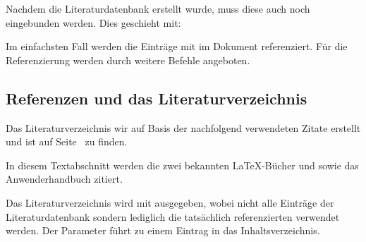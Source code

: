 \documentclass[%
  english,ngerman,%
  geometry=no,DIV=12,automark,%
]{tudscrartcl}
\begin{document}
%
Nachdem die Literaturdatenbank erstellt wurde, muss diese auch noch eingebunden 
werden. Dies geschieht mit:
%
\begin{Preamble}


\end{Preamble}
%
Im einfachsten Fall werden die Einträge mit  im 
Dokument referenziert. Für die Referenzierung werden durch  
weitere Befehle angeboten.
%
\begin{refsection}
\begin{Trunk+}
\section{Referenzen und das Literaturverzeichnis}
Das Literaturverzeichnis wir auf Basis der nachfolgend verwendeten 
Zitate erstellt und ist auf Seite~\pageref{sec:bibliography} zu finden.
\end{Trunk+}
\begin{Trunk*}
In diesem Textabschnitt werden die zwei bekannten \LaTeX-Bücher
\cite{knuth84} und \cite{goossens94} sowie das Anwenderhandbuch
\cite{hanisch14} zitiert.

\end{Trunk*}
%
Das Literaturverzeichnis wird mit  ausgegeben, wobei 
nicht alle Einträge der Literaturdatenbank sondern lediglich die tatsächlich 
referenzierten verwendet werden. Der Parameter  führt 
zu einem Eintrag in das Inhaltsverzeichnis.
%
\begin{Hint}
\printbibliography[heading=bibintoc]
\end{Hint}
\begin{quoting}[rightmargin=0pt]
\makeatletter
\let\markboth\@gobbletwo
\let\markright\@gobble
\makeatother
\vspace*{-\baselineskipglue}
\printbibliography
\end{quoting}
\end{refsection}
\end{document}
